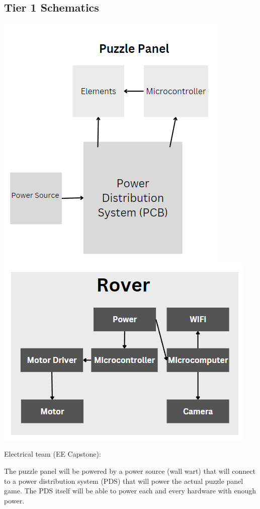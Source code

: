 \documentclass[a4paper, 10pt]{article}
\begin{document}
	\subsection{Tier 1 Schematics}

\includegraphics[scale=0.8]{Puzzle Panel tier 1 schematic}
\includegraphics[scale=0.8]{Rover tier 1 schematic}


	Electrical team (EE Capstone):
	
The puzzle panel will be powered by a power source (wall wart) that will connect to a power distribution system (PDS) that will power the actual puzzle panel game. The PDS itself will be able to power each and every hardware with enough power.
\end{document}
